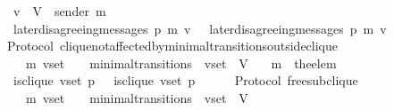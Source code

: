 \begin{isabellebody}
\ \ {\isasymlongrightarrow}\ v\ {\isasymin}\ V\ {\isacharminus}\ {\isacharbraceleft}sender\ m{\isacharprime}{\isacharbraceright}\isanewline
\ \ {\isasymlongrightarrow}\ later{\isacharunderscore}disagreeing{\isacharunderscore}messages\ {\isacharparenleft}p{\isacharcomma}\ m{\isacharcomma}\ v{\isacharcomma}\ {\isasymsigma}{\isacharparenright}\ {\isacharequal}\ later{\isacharunderscore}disagreeing{\isacharunderscore}messages\ {\isacharparenleft}p{\isacharcomma}\ m{\isacharcomma}\ v{\isacharcomma}\ {\isasymsigma}{\isacharprime}{\isacharparenright}{\isachardoublequoteclose}\isanewline
%
\isadelimproof
\ \ %
\endisadelimproof
%
\isatagproof
{}\isamarkupfalse%
%
\endisatagproof
{\isafoldproof}%
%
\isadelimproof
\isanewline
%
\endisadelimproof
\isanewline
\isanewline
\isanewline
{}\isamarkupfalse%
\ {\isacharparenleft}\ Protocol{\isacharparenright}\ clique{\isacharunderscore}not{\isacharunderscore}affected{\isacharunderscore}by{\isacharunderscore}minimal{\isacharunderscore}transitions{\isacharunderscore}outside{\isacharunderscore}clique\ {\isacharcolon}\isanewline
\ \ {\isachardoublequoteopen}{\isasymforall}\ {\isasymsigma}\ {\isasymsigma}{\isacharprime}\ m{\isacharprime}\ v{\isacharunderscore}set{\isachardot}\ {\isacharparenleft}{\isasymsigma}{\isacharcomma}\ {\isasymsigma}{\isacharprime}{\isacharparenright}\ {\isasymin}\ minimal{\isacharunderscore}transitions\ {\isasymand}\ v{\isacharunderscore}set\ {\isasymsubseteq}\ V\isanewline
\ \ {\isasymlongrightarrow}\ m{\isacharprime}\ {\isacharequal}\ the{\isacharunderscore}elem\ {\isacharparenleft}{\isasymsigma}{\isacharprime}\ {\isacharminus}\ {\isasymsigma}{\isacharparenright}\isanewline
\ \ {\isasymlongrightarrow}\ is{\isacharunderscore}clique\ {\isacharparenleft}v{\isacharunderscore}set{\isacharcomma}\ p{\isacharcomma}\ {\isasymsigma}{\isacharparenright}\ {\isacharequal}\ is{\isacharunderscore}clique\ {\isacharparenleft}v{\isacharunderscore}set{\isacharcomma}\ p{\isacharcomma}\ {\isasymsigma}{\isacharprime}{\isacharparenright}{\isachardoublequoteclose}\isanewline
%
\isadelimproof
\ \ %
\endisadelimproof
%
\isatagproof
{}\isamarkupfalse%
%
\endisatagproof
{\isafoldproof}%
%
\isadelimproof
\isanewline
%
\endisadelimproof
\isanewline
\isanewline
\isanewline
\isanewline
\isanewline
\isanewline
{}\isamarkupfalse%
\ {\isacharparenleft}\ Protocol{\isacharparenright}\ free{\isacharunderscore}sub{\isacharunderscore}clique\ {\isacharcolon}\isanewline
\ \ {\isachardoublequoteopen}{\isasymforall}\ {\isasymsigma}\ {\isasymsigma}{\isacharprime}\ m{\isacharprime}\ v{\isacharunderscore}set{\isachardot}\ {\isacharparenleft}{\isasymsigma}{\isacharcomma}\ {\isasymsigma}{\isacharprime}{\isacharparenright}\ {\isasymin}\ minimal{\isacharunderscore}transitions\ {\isasymand}\ v{\isacharunderscore}set\ {\isasymsubseteq}\ V\isanewline

\end{isabellebody}
